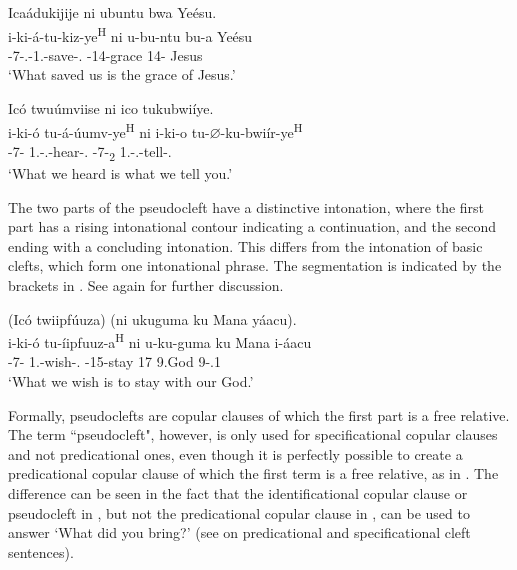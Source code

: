 \documentclass[output=paper]{langscibook}
\begin{document}
\ea
\label{bkm:Ref78794744}
Icaádukijije ni ubuntu bwa Yeésu.\\
\gll
i-ki-á-tu-kiz-ye\textsuperscript{H}  ni  u-bu-ntu  bu-a  Yeésu\\
\AUG{}-7-\RMT.\PST{}-1\PL{}.\OM{}-save-\PFV.\REL{}  \COP{}  \AUG{}-14-grace  14-\CONN{}  Jesus\\
\glt
‘What saved us is the grace of Jesus.’\\

\z

\ea
\label{bkm:Ref75856897}
Icó twuúmviise ni ico tukubwiíye.\\
\gll
  i-ki-ó  tu-á-úumv-ye\textsuperscript{H}  ni  i-ki-o tu-$\varnothing$-ku-bwiír-ye\textsuperscript{H} \\
  \AUG{}-7-\PRO{}  1\PL.\SM-\RMT.\PST{}-hear-\PFV.\REL{}  \COP{}  \AUG{}-7-\DEM{}\textsubscript{2} 1\PL.\SM-\SG.\OM{}-tell-\PFV.\REL{}\\
\glt
  ‘What we heard is what we tell you.’\\

\z


The two parts of the pseudocleft have a distinctive intonation, where the first part has a rising intonational contour indicating a continuation, and the second ending with a concluding intonation. This differs from the intonation of basic clefts, which form one intonational phrase. The segmentation is indicated by the brackets in . See again \citet{LafkiouiEtAl2016} for further discussion.


\ea
\label{bkm:Ref75764861}
(Icó twiipfúuza) (ni ukuguma ku Mana yáacu).\\
\gll
i-ki-ó  tu-íipfuuz-a\textsuperscript{H}  ni  u-ku-guma  ku  Mana  i-áacu\\
\AUG{}-7-\PRO{}  1\PL.\SM{}-wish-\FV.\REL{}  \COP{}  \AUG{}-15-stay  17  9.God  9-\POSS.1\PL{}\\
\glt
‘What we wish is to stay with our God.’\\

\z

Formally, pseudoclefts are copular clauses of which the first part is a free relative. The term ``pseudocleft", however, is only used for specificational copular clauses  and not predicational ones, even though it is perfectly possible to create a predicational copular clause of which the first term is a free relative, as in . The difference can be seen in the fact that the identificational copular clause or pseudocleft in , but not the predicational copular clause in , can be used to answer ‘What did you bring?’ (see \citealt{DenDikken2013,DenDikken2017} on predicational and specificational cleft sentences).
\end{document}

